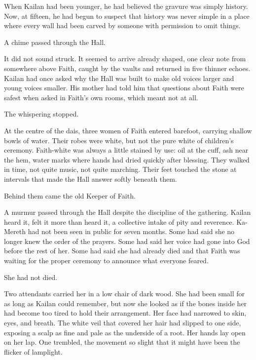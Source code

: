 When Kailan had been younger, he had believed the gravure was simply history. Now, at fifteen, he had begun to suspect that history was never simple in a place where every wall had been carved by someone with permission to omit things.\par

A chime passed through the Hall.\par

It did not sound struck. It seemed to arrive already shaped, one clear note from somewhere above Faith, caught by the vaults and returned in five thinner echoes. Kailan had once asked why the Hall was built to make old voices larger and young voices smaller. His mother had told him that questions about Faith were safest when asked in Faith’s own rooms, which meant not at all.\par

The whispering stopped.\par

At the centre of the dais, three women of Faith entered barefoot, carrying shallow bowls of water. Their robes were white, but not the pure white of children’s ceremony. Faith-white was always a little stained by use: oil at the cuff, ash near the hem, water marks where hands had dried quickly after blessing. They walked in time, not quite music, not quite marching. Their feet touched the stone at intervals that made the Hall answer softly beneath them.\par

Behind them came the old Keeper of Faith.\par

A murmur passed through the Hall despite the discipline of the gathering. Kailan heard it, felt it more than heard it, a collective intake of pity and reverence. Ka-Mereth had not been seen in public for seven months. Some had said she no longer knew the order of the prayers. Some had said her voice had gone into God before the rest of her. Some had said she had already died and that Faith was waiting for the proper ceremony to announce what everyone feared.\par

She had not died.\par

Two attendants carried her in a low chair of dark wood. She had been small for as long as Kailan could remember, but now she looked as if the bones inside her had become too tired to hold their arrangement. Her face had narrowed to skin, eyes, and breath. The white veil that covered her hair had slipped to one side, exposing a scalp as fine and pale as the underside of a root. Her hands lay open on her lap. One trembled, the movement so slight that it might have been the flicker of lamplight.\par

